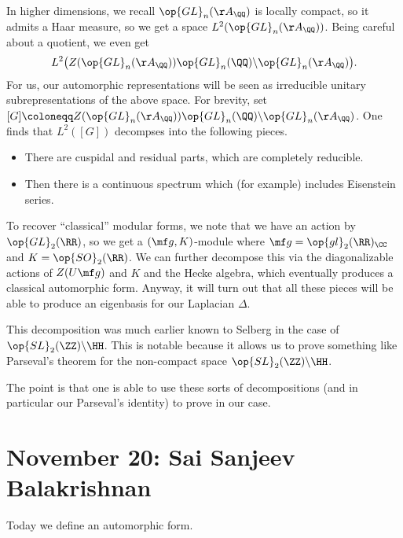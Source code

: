 \documentclass{article}
\begin{document}
In higher dimensions, we recall $\op{GL}_n(\AA_\QQ)$ is locally compact, so it admits a Haar measure, so we get a space $L^2(\op{GL}_n(\AA_\QQ))$. Being careful about a quotient, we even get
\[L^2\big(Z(\op{GL}_n(\AA_\QQ))\op{GL}_n(\QQ)\backslash\op{GL}_n(\AA_\QQ)\big).\]
For us, our automorphic representations will be seen as irreducible unitary subrepresentations of the above space. For brevity, set $[G]\coloneqq Z(\op{GL}_n(\AA_\QQ))\op{GL}_n(\QQ)\backslash\op{GL}_n(\AA_\QQ)$. One finds that $L^2([G])$ decompses into the following pieces.
\begin{itemize}
	\item There are cuspidal and residual parts, which are completely reducible.
	\item Then there is a continuous spectrum which (for example) includes Eisenstein series.
\end{itemize}
To recover ``classical'' modular forms, we note that we have an action by $\op{GL}_2(\RR)$, so we get a $(\mf g,K)$-module where $\mf g=\op{gl}_2(\RR)_\CC$ and $K=\op{SO}_2(\RR)$. We can further decompose this via the diagonalizable actions of $Z(U\mf g)$ and $K$ and the Hecke algebra, which eventually produces a classical automorphic form. Anyway, it will turn out that all these pieces will be able to produce an eigenbasis for our Laplacian $\Delta$.
\begin{remark}
	This decomposition was much earlier known to Selberg in the case of $\op{SL}_2(\ZZ)\backslash\HH$. This is notable because it allows us to prove something like Parseval's theorem for the non-compact space $\op{SL}_2(\ZZ)\backslash\HH$.
\end{remark}
The point is that one is able to use these sorts of decompositions (and in particular our Parseval's identity) to prove  in our case.

\section{November 20: Sai Sanjeev Balakrishnan}
Today we define an automorphic form.
\end{document}
